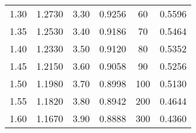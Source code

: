\documentclass[\mainfilename]{subfiles}
\begin{document}
\begin{sectionBox}
\begin{center}
\begin{tabular}{CC *{2}{ |CC }}
            \\ 1.30 & 1.2730 & 3.30 & 0.9256 & 60  & 0.5596
            \\ 1.35 & 1.2530 & 3.40 & 0.9186 & 70  & 0.5464
            \\ 1.40 & 1.2330 & 3.50 & 0.9120 & 80  & 0.5352
            \\ 1.45 & 1.2150 & 3.60 & 0.9058 & 90  & 0.5256
            \\ 1.50 & 1.1980 & 3.70 & 0.8998 & 100 & 0.5130
            \\ 1.55 & 1.1820 & 3.80 & 0.8942 & 200 & 0.4644
            \\ 1.60 & 1.1670 & 3.90 & 0.8888 & 300 & 0.4360
            
            \\\bottomrule
        \end{tabular}
        \\[1ex]
        \vspace{2ex}
    \end{center}
    
\end{sectionBox}
\end{document}
